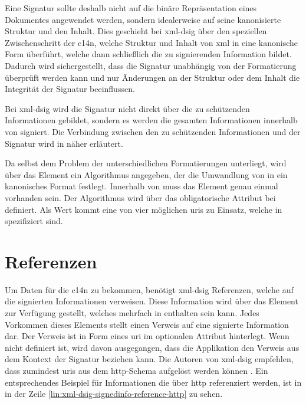 Eine Signatur sollte deshalb nicht auf die binäre Repräsentation eines Dokumentes angewendet werden, sondern idealerweise auf seine kanonisierte
Struktur und den Inhalt. Dies geschieht bei \gls{xml-dsig} über den speziellen Zwischenschritt der \gls{c14n}, welche Struktur und Inhalt von \gls{xml} in eine kanonische 
Form überführt\cite{xml-c14n:w3c,xml-exc-c14n:w3c}, welche dann schließlich die zu signierenden Information bildet. Dadurch wird sichergestellt, dass die Signatur 
unabhängig von der Formatierung überprüft werden kann und nur Änderungen an der Struktur oder dem Inhalt die Integrität der Signatur beeinflussen. 

Bei \gls{xml-dsig} wird die Signatur nicht direkt über die zu schützenden Informationen gebildet, sondern es werden die gesamten Informationen innerhalb von
 signiert. Die Verbindung zwischen den zu schützenden Informationen und der Signatur wird in  näher erläutert.

Da  selbst dem Problem der unterschiedlichen Formatierungen unterliegt, wird über das Element  ein
Algorithmus angegeben, der die Umwandlung von  in ein kanonisches Format festlegt. Innerhalb von  muss das Element
 genau einmal vorhanden sein. Der Algorithmus wird über das obligatorische Attribut 
bei  definiert. Als Wert kommt eine von vier möglichen \glspl{uri} zu Einsatz, welche in \cite{xml-dsig:w3c} spezifiziert sind.

\section{Referenzen}
\label{sec:XML-DSig:Referenzen}
Um Daten für die \gls{c14n} zu bekommen, benötigt \gls{xml-dsig} Referenzen, welche auf die signierten Informationen verweisen. Diese Information wird über das 
Element  zur Verfügung gestellt, welches mehrfach in  enthalten sein kann. Jedes Vorkommen dieses Elements stellt einen
Verweis auf eine signierte Information dar. Der Verweis ist in Form eines \gls{uri} im optionalen Attribut  hinterlegt. Wenn
 nicht definiert ist, wird davon ausgegangen, dass die Applikation den Verweis aus dem Kontext der Signatur beziehen kann. Die
Autoren von \gls{xml-dsig} empfehlen, dass zumindest \glspl{uri} aus dem \gls{http}-Schema aufgelöst werden können \cite{xml-dsig:w3c}. Ein entsprechendes
Beispiel für Informationen die über \gls{http} referenziert werden, ist in  in der Zeile
\ref{lin:xml-dsig-signedinfo-reference-http} zu sehen.

